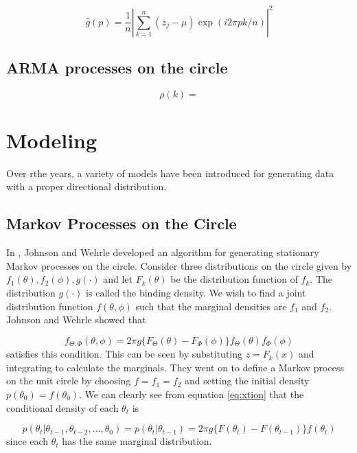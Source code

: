 \documentclass[11pt]{article}
\numberwithin{equation}{section}
\numberwithin{figure}{section}
\begin{document}
\begin{equation}\label{eq:cpgram}
\hat{g}(p) = \frac{1}{n}\left |{ \sum_{k=1}^n (z_j-\mu) \exp(i 2 \pi p k/n ) }\right | ^2
\end{equation}

\subsection{ARMA processes on the circle}

\begin{equation}\label{eq:fishcor}
\rho(k) = 
\end{equation}

\section{Modeling}

Over rthe years, a variety of models have been introduced for generating data with a proper directional distribution. 

\subsection{Markov Processes on the Circle }

In \cite{Johnson} , Johnson and Wehrle developed an algorithm for generating stationary Markov processes on the circle. Consider three distributions on the circle given by $f_1(\theta),f_2(\phi), g(\cdot)$ and let $F_k(\theta)$ be the distribution function of $f_k$. The distribution $g(\cdot)$ is called the binding density. We wish to find a joint distribution function $f(\theta, \phi)$ such that the marginal densities are $f_1$ and $f_2$. Johnson and Wehrle showed that 

\begin{equation}\label{eq:xtion}
 f_{\Theta, \Phi}(\theta, \phi) = 2\pi g\{ F_{\Theta}(\theta)  -  F_\Phi(\phi) \}f_\Theta(\theta)f_\Phi(\phi)
\end{equation}
satisfies this condition. This can be seen by substituting $z = F_k( x )$ and integrating to calculate the marginals. They went on to define a Markov process on the unit circle by choosing $f=f_1=f_2$ and setting the initial density $p(\theta_0) = f(\theta_0)$. We can clearly see from equation \ref{eq:xtion} that the conditional density of each $\theta_t$ is 

\begin{equation} \label{eq:xdensity}
p(\theta_t | \theta_{t-1}, \theta_{t-2}, ..., \theta_0) = p(\theta_t | \theta_{t-1} )=  2\pi g\{ F(\theta_t)  -  F(\theta_{t-1}) \}f(\theta_t)
\end{equation}
since each $\theta_t$ has the same marginal distribution.
\end{document}
